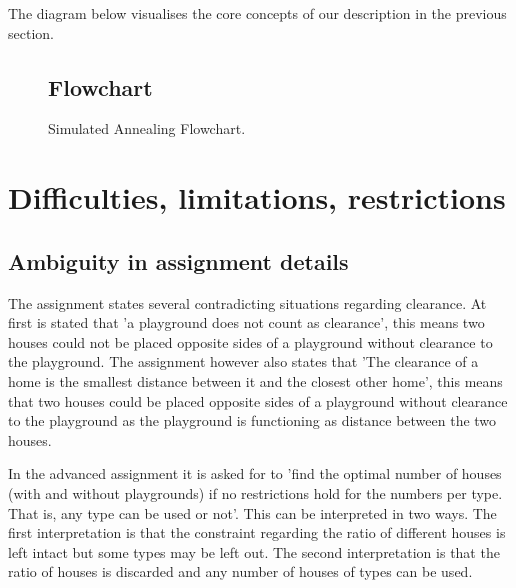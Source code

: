 \documentclass{article}
\begin{document}
\pagebreak


The diagram below visualises the core concepts of our description in the previous section. 

\begin{figure}
\subsection{Flowchart}
  \caption{Simulated Annealing Flowchart.}
  \label{fig:flowchart}
\end{figure}


\section{Difficulties, limitations, restrictions}

\subsection{Ambiguity in assignment details}

The assignment states several contradicting situations regarding clearance. At first is stated that 'a playground does not count as clearance', this means two houses could not be placed opposite sides of a playground without clearance to the playground. The assignment however also states that 'The clearance of a home is the smallest distance between it and the closest other home', this means that two houses could be placed opposite sides of a playground without clearance to the playground as the playground is functioning as distance between the two houses.

In the advanced assignment it is asked for to 'find the optimal number of houses (with and without playgrounds) if no restrictions hold for the numbers per type. That is, any type can be used or not'. This can be interpreted in two ways. The first interpretation is that the constraint regarding the ratio of different houses is left intact but some types may be left out. The second interpretation is that the ratio of houses is discarded and any number of houses of types can be used.
\end{document}

